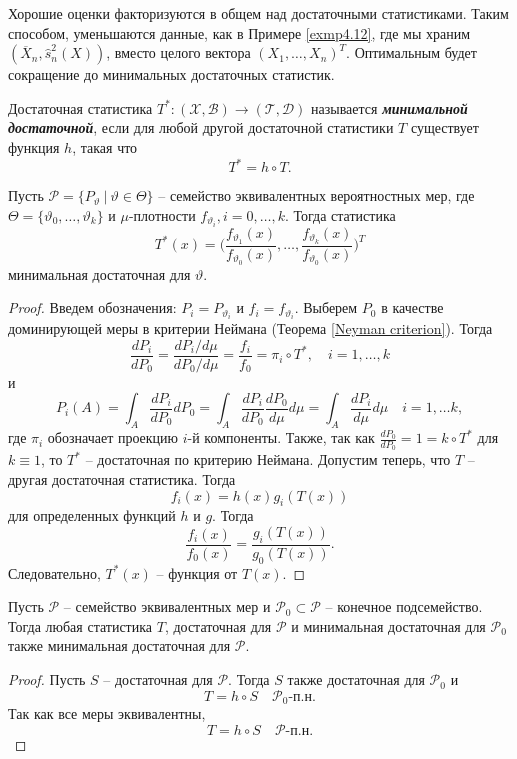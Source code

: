 \begin{rmrk}
	Хорошие оценки факторизуются в общем над достаточными статистиками. Таким способом, уменьшаются данные, как в Примере \ref{exmp4.12}, где мы храним $(\overline{X}_n, \hat{s}_n^2(X))$, вместо целого вектора $(X_1, \dots, X_n)^T$. Оптимальным будет сокращение до минимальных достаточных статистик. 
\end{rmrk}

\begin{defn}
	Достаточная статистика $T^*\colon(\mathcal{X}, \mathcal{B}) \rightarrow (\mathcal{T}, \mathcal{D})$ называется \textbf{\textit{минимальной достаточной}}, если для любой другой достаточной статистики $T$ существует функция $h$, такая что
	\[T^*=h \circ T. \]
\end{defn}

\begin{exmp} \label{exmp4.20}
	Пусть $\mathcal{P} = \{P_\vartheta\ |\ \vartheta \in \Theta\}$ -- семейство эквивалентных вероятностных мер, где $\Theta = \{\vartheta_0, \dots, \vartheta_k\}$ и $\mu$-плотности $f_{\vartheta_i}, i = 0, \dots, k$. Тогда статистика
	\[ T^*(x) = \bigg(\frac{f_{\vartheta_1}(x)}{f_{\vartheta_0}(x)}, \dots, \frac{f_{\vartheta_k}(x)}{f_{\vartheta_0}(x)}\bigg)^T \]
	минимальная достаточная для $\vartheta$.
\end{exmp}
\begin{proof}
	Введем обозначения: $P_i = P_{\vartheta_i}$ и $f_i = f_{\vartheta_i}$. Выберем $P_0$ в качестве доминирующей меры в критерии Неймана (Теорема \ref{Neyman criterion}). Тогда
	\[ \frac{dP_i}{dP_0} = \frac{dP_i / d\mu}{dP_0 / d\mu} = \frac{f_i}{f_0} = \pi_i \circ T^*, \quad i = 1, \dots, k \]
	и
	\[ P_i(A) = \int_A \frac{dP_i}{dP_0} dP_0 = \int_A \frac{dP_i}{dP_0} \frac{dP_0}{d\mu} d\mu = \int_A \frac{dP_i}{d\mu} d\mu \quad i = 1, \dots k, \]
	где $\pi_i$ обозначает проекцию $i$-й компоненты. Также, так как $\frac{dP_0}{dP_0} = 1 = k \circ T^*$ для $k \equiv 1$, то $T^*$ -- достаточная по критерию Неймана. Допустим теперь, что $T$ -- другая достаточная статистика. Тогда
	\[ f_i(x) = h(x) g_i(T(x)) \]
	для определенных функций $h$ и $g$. Тогда
	\[\frac{f_i(x)}{f_0(x)} = \frac{g_i(T(x))}{g_0(T(x))}. \]
	Следовательно, $T^*(x)$ -- функция от $T(x)$.
\end{proof}

\begin{lmm} \label{lmm4.21}
	Пусть $\mathcal{P}$ -- семейство эквивалентных мер и $\mathcal{P}_0 \subset \mathcal{P}$ -- конечное подсемейство. Тогда любая статистика $T$, достаточная для $\mathcal{P}$ и минимальная достаточная для $\mathcal{P}_0$ также минимальная достаточная для $\mathcal{P}$.
\end{lmm}
\begin{proof}
	Пусть $S$ -- достаточная для $\mathcal{P}$. Тогда $S$ также достаточная для $\mathcal{P}_0$ и
	\[ T = h \circ S \quad \mathcal{P}_0\text{-п.н.} \]
	Так как все меры эквивалентны, 
	\[ T = h \circ S \quad \mathcal{P}\text{-п.н.} \]
\end{proof}

